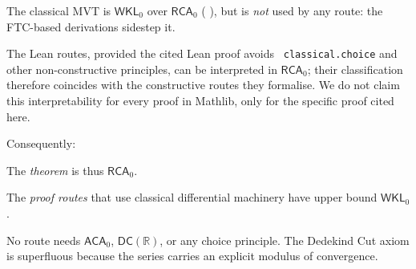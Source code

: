 \documentclass[11pt,reqno]{amsart}
\makeatletter
\theoremstyle{redplain}
\renewenvironment{quotation}
{\list{}{\listparindent\z@
		\itemindent\z@
		\rightmargin\leftmargin
		\parsep\z@}	\item\relax}
{\endlist}
\numberwithin{equation}{section}
\makeatother
\begin{document}
\begin{quotation}
\noindent The classical MVT is $\mathsf{WKL}_{0}$ over $\mathsf{RCA}_{0}$ (%
\cite[II.7]{Simpson2009}), but is \emph{not} used by any route: the
FTC-based derivations sidestep it.

\noindent The Lean routes, provided the cited Lean proof avoids \texttt{%
classical.choice} and other non-constructive principles, can be interpreted
in $\mathsf{RCA}_{0}$; their classification therefore coincides with the
constructive routes they formalise. We do not claim this interpretability
for every proof in Mathlib, only for the specific proof cited here. \medskip
\noindent

Consequently:
\end{quotation}

\begin{center}
\end{center}

\begin{quotation}
\noindent The \emph{theorem} is thus $\mathsf{RCA}_{0}$.

The \emph{proof routes} that use classical differential machinery have upper
bound $\mathsf{WKL}_{0}$.

No route needs $\mathsf{ACA}_{0}$, $\mathsf{DC}\left( \mathbb{R}\right) $,
or any choice principle.\newline
The Dedekind Cut axiom is superfluous because the series carries an explicit
modulus of convergence.
\end{quotation}
\end{document}
